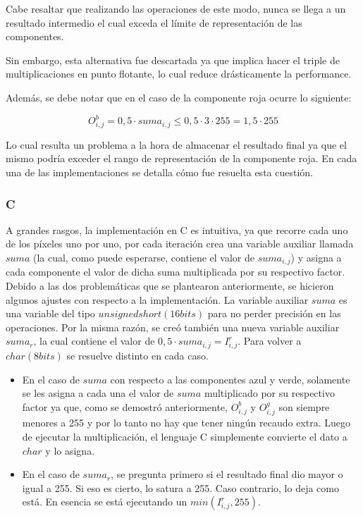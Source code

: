 Cabe resaltar que realizando las operaciones de este modo, nunca se llega a un resultado intermedio el cual exceda el límite de representación de las componentes.

Sin embargo, esta alternativa fue descartada ya que implica hacer el triple de multiplicaciones en punto flotante, lo cual reduce drásticamente la performance.

Además, se debe notar que en el caso de la componente roja ocurre lo siguiente:

	$$ O^b_{i,j} = 0,5 \cdot suma_{i,j} \leq 0,5 \cdot 3 \cdot 255 = 1,5 \cdot 255$$

Lo cual resulta un problema a la hora de almacenar el resultado final ya que el mismo podría exceder el rango de representación de la componente roja. En cada una de las implementaciones se detalla cómo fue resuelta esta cuestión.

\subsubsection{C}

A grandes rasgos, la implementación en C es intuitiva, ya que recorre cada uno de los píxeles uno por uno, por cada iteración crea una variable auxiliar llamada $suma$ (la cual, como puede esperarse, contiene el valor de $suma_{i,j}$) y asigna a cada componente el valor de dicha suma multiplicada por su respectivo factor.
Debido a las dos problemáticas que se plantearon anteriormente, se hicieron algunos ajustes con respecto a la implementación. La variable auxiliar $suma$ es una variable del tipo $unsigned short (16 bits)$  para no perder precisión en las operaciones. Por la misma razón, se creó también una nueva variable auxiliar $suma_r$, la cual contiene el valor de $0,5 \cdot suma_{i,j} = I^r_{i,j}$.
Para volver a $char (8 bits)$ se resuelve distinto en cada caso.
\begin{itemize}
	\item En el caso de $suma$ con respecto a las componentes azul y verde, solamente se les asigna a cada una el valor de $suma$ multiplicado por su respectivo factor ya que, como se demostró anteriormente, $O^b_{i,j}$ y $O^g_{i,j}$ son siempre menores a 255 y por lo tanto no hay que tener ningún recaudo extra. Luego de ejecutar la multiplicación, el lenguaje C simplemente convierte el dato a $char$ y lo asigna.
	\item En el caso de $suma_r$, se pregunta primero si el resultado final dio mayor o igual a 255. Si eso es cierto, lo satura a 255. Caso contrario, lo deja como está. En esencia se está ejecutando un $min(I^r_{i,j},255)$.
\end{itemize}

